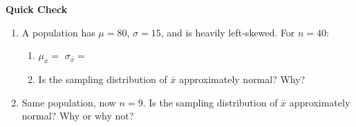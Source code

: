 \documentclass[10pt]{article}
\begin{document}
\begin{practicebox}
\textbf{Quick Check}
\begin{enumerate}
  \item A population has $\mu = 80$, $\sigma = 15$, and is heavily left-skewed. For $n = 40$:
        \begin{enumerate}[label=\alph*.]
          \item $\mu_{\bar{x}} = $  \hspace{1cm} $\sigma_{\bar{x}} = $ 
          \item Is the sampling distribution of $\bar{x}$ approximately normal? Why?
                \\
        \end{enumerate}
  \item Same population, now $n = 9$. Is the sampling distribution of $\bar{x}$ approximately
        normal? Why or why not?
        \ansline{}\\
\end{enumerate}
\end{practicebox}
\end{document}
